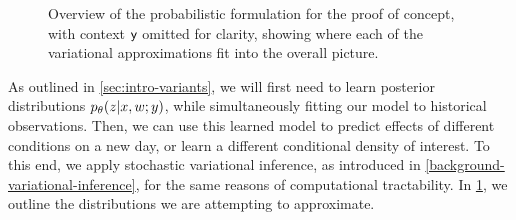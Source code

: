 \begin{figure} [htb!]
    \centering
    \caption{Overview of the probabilistic formulation for the proof of concept, with context $\mathsf y$ omitted for clarity, showing where each of the variational approximations fit into the overall picture.}
    \label{fig:wzx-poc}
\end{figure}


As outlined in \cref{sec:intro-variants}, we will first need to learn posterior distributions $\pld{z\given x,w;y}$, while simultaneously fitting our model to historical observations. Then, we can use this learned model to predict effects of different conditions on a new day, or learn a different conditional density of interest. To this end, we apply stochastic variational inference, as introduced in \cref{background-variational-inference}, for the same reasons of computational tractability. In \cref{fig:wzx-poc}, we outline the distributions we are attempting to approximate. 

